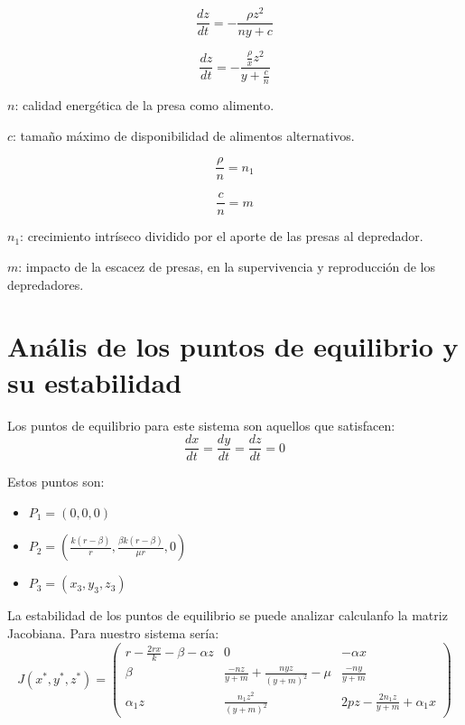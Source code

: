 \documentclass{wscpaperproc}
\theoremstyle{wsc}
\begin{document}
$$\frac{dz}{dt} =-\frac{\rho z^2}{n y+c}$$

$$\frac{dz}{dt} =-\frac{\frac{\rho}{x} z^2}{y+\frac{c}{n}}$$

$n$: calidad energética de la presa como alimento.

$c$: tamaño máximo de disponibilidad de alimentos alternativos.

\vspace*{0.5cm}

$$\frac{\rho}{n}=n_1$$

$$\frac{c}{n}=m$$

$n_1$: crecimiento intríseco dividido por el aporte de las presas al depredador.

$m$: impacto de la escacez de presas, en la supervivencia y reproducción de los depredadores.


\vspace*{3cm}

\section*{Anális de los puntos de equilibrio y su estabilidad}

Los puntos de equilibrio para este sistema son aquellos que satisfacen:
$$\frac{dx}{dt}=\frac{dy}{dt}=\frac{dz}{dt}=0$$

Estos puntos son:
\begin{itemize}
	\item $P_1=(0, 0, 0)$
	\item $P_2=(\frac{k(r-\beta)}{r}, \frac{\beta k(r-\beta)}{\mu r}, 0)$
	\item $P_3=(x_3, y_3, z_3)$
\end{itemize}

La estabilidad de los puntos de equilibrio se puede analizar calculanfo la matriz Jacobiana. Para nuestro sistema sería:
$$ J(x^*, y^*, z^*) = \left(
	\begin{array}{ccc}
			r-\frac{2rx}{k}-\beta-\alpha z & 0                                       & -\alpha x                       \\
			\beta                          & \frac{-nz}{y+m}+\frac{nyz}{(y+m)^2}-\mu & \frac{-ny}{y+m}                 \\
			\alpha_1z                      & \frac{n_1z^2}{(y+m)^2}                  & 2pz-\frac{2n_1z}{y+m}+\alpha_1x
		\end{array}
	\right)$$
\end{document}
